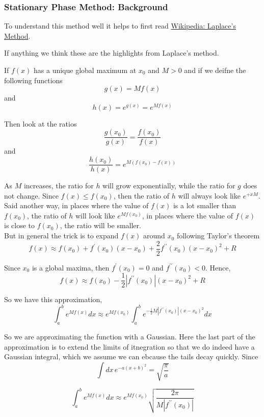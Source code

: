 \subsubsection{Stationary Phase Method: Background}

To understand this method well it helps to first read
\href{https://en.wikipedia.org/wiki/Laplace%27s_method}{Wikipedia: Laplace's Method}.

If anything we think these are the highlights from Laplace's method.

If $f(x)$ has a unique global maximum at $x_0$ and $M>0$ and if we deifne the following functions
$$
g(x) = Mf(x)
$$
and
$$
h(x) = e^{g(x)} = e^{Mf(x)}
$$

Then look at the ratios
$$
\frac{g(x_0)}{g(x)} = \frac{f(x_0)}{f(x)}
$$
and
$$
\frac{h(x_0)}{h(x)} = e^{M(f(x_0) - f(x))}
$$

As $M$ increases, the ratio for $h$ will grow exponentially, while the ratio for $g$ does not change.
Since $f(x) \leq f(x_0)$, then the ratio of $h$ will always look like $e^{+{x}M}$.
Said another way, in places where the value of $f(x)$ is a lot smaller than $f(x_0)$, the ratio of $h$ will look like
$e^{Mf(x_0)}$, in places where the value of $f(x)$ is close to $f(x_0)$, the ratio will be smaller.
\\

But in general the trick is to expand $f(x)$ around $x_0$ following Taylor's theorem
$$
f(x) \approx
    f(x_0) + f^{\prime} (x_0) (x-x_0) + \frac{2}{2} f^{\prime\prime} (x_0) (x-x_0)^2 + R
$$

Since $x_0$ is a global maxima, then $f^{\prime} (x_0) = 0$ and $f^{\prime\prime} (x_0) < 0$.
Hence,
$$
f(x) \approx
    f(x_0) - \frac{1}{2} |f^{\prime\prime} (x_0)| (x-x_0)^2 + R
$$

So we have this approximation,
$$
\int_{a}^{b} e^{Mf(x)} dx \approx
    e^{Mf(x_0)} \int_{a}^{b} e^{- \frac{1}{2} M |f^{\prime\prime} (x_0)| (x-x_0)^2} dx
$$

So we are approximating the function with a Gaussian.
Here the last part of the approximation is to extend the limits of itnegration so that we do indeed have a Gaussian integral,
which we assume we can ebcause the tails decay quickly.
Since
$$
\int dx\, e^{-a(x+b)^2} = \sqrt{ \frac{\pi}{a} }
$$

$$
\int_{a}^{b} e^{Mf(x)} dx \approx
    e^{Mf(x_0)} \sqrt{ \frac{2\pi}{M |f^{\prime\prime} (x_0)|} }
$$

